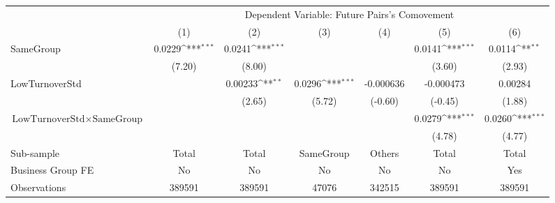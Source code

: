{
\def\sym#1{\ifmmode^{#1}\else\(^{#1}\)\fi}
\begin{tabular}{l*{6}{c}}
\hline\hline
                &\multicolumn{6}{c}{Dependent Variable:  Future Pairs's Comovement}                                               \\\cmidrule(lr){2-7}
                &\multicolumn{1}{c}{(1)}         &\multicolumn{1}{c}{(2)}         &\multicolumn{1}{c}{(3)}         &\multicolumn{1}{c}{(4)}         &\multicolumn{1}{c}{(5)}         &\multicolumn{1}{c}{(6)}         \\
\hline
SameGroup       &   0.0229\sym{***}&   0.0241\sym{***}&                  &                  &   0.0141\sym{***}&   0.0114\sym{**} \\
                &   (7.20)         &   (8.00)         &                  &                  &   (3.60)         &   (2.93)         \\
[1em]
LowTurnoverStd  &                  &  0.00233\sym{**} &   0.0296\sym{***}&-0.000636         &-0.000473         &  0.00284         \\
                &                  &   (2.65)         &   (5.72)         &  (-0.60)         &  (-0.45)         &   (1.88)         \\
[1em]
$ {\text{LowTurnoverStd} } \times {\text{SameGroup} }  $ &                  &                  &                  &                  &   0.0279\sym{***}&   0.0260\sym{***}\\
                &                  &                  &                  &                  &   (4.78)         &   (4.77)         \\
\hline
Sub-sample      &    Total         &    Total         &SameGroup         &   Others         &    Total         &    Total         \\
Business Group FE&       No         &       No         &       No         &       No         &       No         &      Yes         \\
Observations    &   389591         &   389591         &    47076         &   342515         &   389591         &   389591         \\
\hline\hline  \end{tabular}}
